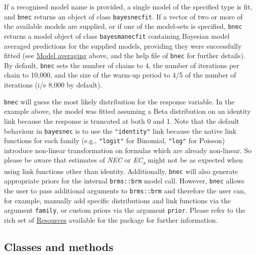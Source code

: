 \begin{Schunk}
\end{Schunk}

If a recognised model name is provided, a single model of the specified
type is fit, and \texttt{bnec} returns an object of class
\texttt{bayesnecfit}. If a vector of two or more of the available models
are supplied, or if one of the model-sets is specified, \texttt{bnec}
returns a model object of class \texttt{bayesmanecfit} containing
Bayesian model averaged predictions for the supplied models, providing
they were successfully fitted (see \protect\hyperlink{modavg}{Model
averaging} above, and the help file of \texttt{bnec} for further
details). By default, \texttt{bnec} sets the number of chains to 4, the
number of iterations per chain to 10,000, and the size of the warm-up
period to 4/5 of the number of iterations (i/e 8,000 by default).

\texttt{bnec} will guess the most likely distribution for the response
variable. In the example above, the model was fitted assuming a Beta
distribution on an identity link because the response is truncated at
both 0 and 1. Note that the default behaviour in \texttt{bayesnec} is to
use the \texttt{"identity"} link because the native link functions for
each family (e.g., \texttt{"logit"} for Binomial, \texttt{"log"} for
Poisson) introduce non-linear transformation on formulas which are
already non-linear. So please be aware that estimates of \emph{NEC} or
\emph{EC\textsubscript{x}} might not be as expected when using link
functions other than identity. Additionally, \texttt{bnec} will also
generate appropriate priors for the internal \texttt{brms::brm} model
call. However, \texttt{bnec} allows the user to pass additional
arguments to \texttt{brms::brm} and therefore the user can, for example,
manually add specific distributions and link functions via the argument
\texttt{family}, or custom priors via the argument \texttt{prior}.
Please refer to the rich set of
\href{https://github.com/paul-buerkner/brms}{Resources} available for
the  package for further information.

\hypertarget{classes-and-methods}{%
\subsection{Classes and methods}\label{classes-and-methods}}

